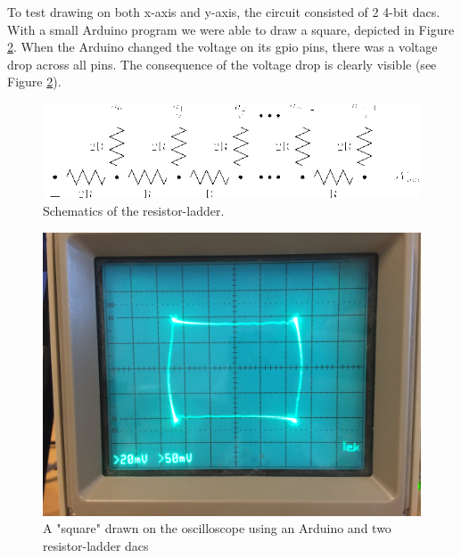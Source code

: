 To test drawing on both x-axis and y-axis, the circuit consisted of 2 4-bit \gls{dac}s.
With a small Arduino program we were able to draw a square, depicted in Figure \ref{fig:osc_poc}.
When the Arduino changed the voltage on its \gls{gpio} pins, there was a voltage drop across all pins.
The consequence of the voltage drop is clearly visible (see Figure \ref{fig:osc_poc}).


\begin{figure}[h]
\includegraphics[width=\columnwidth]{images/r2r-ladder}
\centering
\caption{Schematics of the resistor-ladder\cite{r2r-ladder-schematics}.}
\label{fig:r2r-ladder}
\end{figure}

\begin{figure}[h]
\includegraphics[width=\columnwidth]{images/osc_square_close}
\centering
\caption{A "square" drawn on the oscilloscope using an Arduino and two resistor-ladder \gls{dac}s}
\label{fig:osc_poc}
\end{figure}
